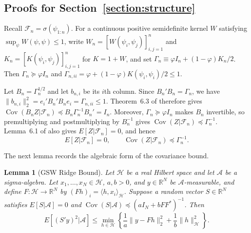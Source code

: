 \documentclass[letterpaper,12pt]{article}
\newtheorem{lem}[thm]{Lemma}
\theoremstyle{definition}
\numberwithin{equation}{section}
\newcommand{\norm}[1]{\lVert#1\rVert}
\DeclareMathOperator{\cov}{Cov}
\begin{document}
\subsection{Proofs for Section~\ref{section:structure}}\label{appendix:proofs-section4}

Recall $\mathcal F_n=\sigma(\psi_{1:n})$. For a continuous positive semidefinite kernel $W$ satisfying $\sup_{\psi}W(\psi,\psi)\leq1$, write $W_n=[W(\psi_i,\psi_j)]_{i,j=1}^n$ and $K_n=[K(\psi_i,\psi_j)]_{i,j=1}^n$ for $K=1+W$, and set $\Gamma_n\equiv\varphi I_n+(1-\varphi)K_n/2$. Then $\Gamma_n\succeq\varphi I_n$ and $\Gamma_{n,ii}=\varphi+(1-\varphi)K(\psi_i,\psi_i)/2\leq1$.

Let $B_n=\Gamma_n^{1/2}$ and let $b_{n,i}$ be its $i$th column. Since $B_n'B_n=\Gamma_n$, we have $\norm{b_{n,i}}_2^2=e_i'B_n'B_ne_i=\Gamma_{n,ii}\leq1$. Theorem~6.3 of \citet{harshaw2024gsw} therefore gives $\cov(B_nZ|\mathcal F_n)\preceq B_n\Gamma_n^{-1}B_n'=I_n$. Moreover, $\Gamma_n\succeq\varphi I_n$ makes $B_n$ invertible, so premultiplying and postmultiplying by $B_n^{-1}$ gives $\cov(Z|\mathcal F_n)\preceq\Gamma_n^{-1}$. Lemma~6.1 of \citet{harshaw2024gsw} also gives $E[Z|\mathcal F_n]=0$, and hence
\begin{equation}\label{equation:proof-section4-gsw-covariance}
E[Z|\mathcal F_n]=0, \qquad \cov(Z|\mathcal F_n)\preceq \Gamma_n^{-1}.
\end{equation}

The next lemma records the algebraic form of the covariance bound.

\begin{lem}[GSW Ridge Bound]\label{lemma:proof-gsw-ridge}
Let $\mathcal H$ be a real Hilbert space and let $\mathcal A$ be a sigma-algebra. Let $x_1,\ldots,x_N\in\mathcal H$, $a,b>0$, and $y\in\mathbb R^N$ be $\mathcal A$-measurable, and define $F:\mathcal H\to\mathbb R^N$ by $(Fh)_i=\langle h,x_i\rangle_{\mathcal H}$. Suppose a random vector $S\in\mathbb R^N$ satisfies $E[S|\mathcal A]=0$ and $\cov(S|\mathcal A)\preceq(aI_N+bFF^*)^{-1}$. Then
\begin{equation}\label{equation:proof-gsw-ridge-bound}
E[(S'y)^2|\mathcal A]\leq\min_{h\in\mathcal H}\left\{\frac1a\norm{y-Fh}_2^2+\frac1b\norm{h}_{\mathcal H}^2\right\}.
\end{equation}
\end{lem}
\end{document}
